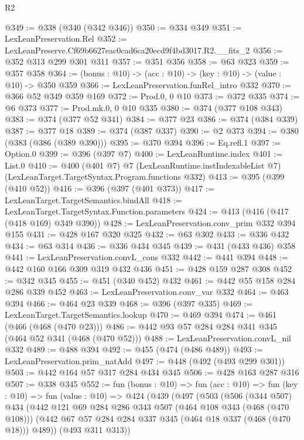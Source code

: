 \begin{lexlean}{R2}
\begin{coremodule}
@349 := @338 (@340 (@342 @346))
@350 := @334 @349
@351 := LexLeanPreservation.Rel
@352 := LexLeanPreserve.Cf69b6627eac0cad6ca20ecd9f4bd3017.R2.__fits_2
@356 := @352 @313 @299 @301 @311
@357 := @351 @356
@358 := @63 @323
@359 := @357 @358
@364 := (bonus : @10) -> (acc : @10) -> (key : @10) -> (value : @10) -> @350 @359
@366 := LexLeanPreservation.funRel_intro @332
@370 := @366 @52 @349 @359 @169
@372 := Prod.{0, 0} @10
@373 := @372 @335
@374 := @6 @373
@377 := Prod.mk.{0, 0} @10 @335
@380 := @374 (@377 @108 @343)
@383 := @374 (@377 @52 @341)
@384 := @377 @23
@386 := @374 (@384 @339)
@387 := @377 @18
@389 := @374 (@387 @337)
@390 := @2 @373
@394 := @380 (@383 (@386 (@389 @390)))
@395 := @370 @394
@396 := Eq.refl.{1}
@397 := Option.{0}
@399 := @396 (@397 @7)
@400 := LexLeanRuntime.index
@401 := List.{0}
@410 := @400
    (@401 @7)
    @7
    (LexLeanRuntime.instIndexableList @7)
    (LexLeanTarget.TargetSyntax.Program.functions @332)
@413 := @395 (@399 (@410 @52))
@416 := @396 (@397 (@401 @373))
@417 := LexLeanTarget.TargetSemantics.bindAll
@418 := LexLeanTarget.TargetSyntax.Function.parameters
@424 := @413 (@416 (@417 (@418 @169) @349 @390))
@428 := LexLeanPreservation.conv_prim @332 @394 @155
@431 := @428 @167 @320 @325
@432 := @63 @302
@433 := @336 @432
@434 := @63 @314
@436 := @336 @434 @345
@439 := @431 (@433 @436) @358
@441 := LexLeanPreservation.convL_cons @332
@442 := @441 @394
@448 := @442 @160 @166 @309 @319 @432 @436
@451 := @428 @159 @287 @308
@452 := @342 @345
@455 := @451 (@340 @452) @432
@461 := @442 @55 @158 @284 @286 @339 @452
@463 := LexLeanPreservation.conv_var @332
@464 := @463 @394
@466 := @464 @23 @339
@468 := @396 (@397 @335)
@469 := LexLeanTarget.TargetSemantics.lookup
@470 := @469 @394
@474 := @461 (@466 (@468 (@470 @23)))
@486 := @442 @93 @57 @284 @284 @341 @345 (@464 @52 @341 (@468 (@470 @52)))
@488 := LexLeanPreservation.convL_nil @332
@489 := @488 @394
@492 := @455 (@474 (@486 @489))
@493 := LexLeanPreservation.prim_natAdd
@497 := @448 (@492 (@493 @299 @301))
@503 := @442 @164 @57 @317 @284 @434 @345
@506 := @428 @163 @287 @316
@507 := @338 @345
@552 := fun (bonus : @10) =>
  fun (acc : @10) =>
  fun (key : @10) =>
  fun (value : @10) =>
  @424
    (@439
      (@497
        (@503
          (@506
            (@344 @507)
            @434
            (@442
              @121
              @69
              @284
              @286
              @343
              @507
              (@464 @108 @343 (@468 (@470 @108)))
              (@442 @67 @57 @284 @284 @337 @345 (@464 @18 @337 (@468 (@470 @18))) @489))
            (@493 @311 @313))

\end{coremodule}
\end{lexlean}
